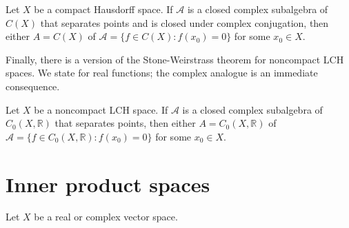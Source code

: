\documentclass{article}
\theoremstyle{definition}
\numberwithin{equation}{section}
\newcommand{\R}{\mathbb{R}}
\begin{document}
		\begin{thm}
			Let $X$ be a compact Hausdorff space. If $\mathcal{A}$ is a closed complex subalgebra of $C(X)$ that separates points and is closed under complex conjugation, then either $A=C(X)$ of $\mathcal{A}=\{f\in C(X):f(x_0)=0\}$ for some $x_0\in X$.
		\end{thm}
		Finally, there is a version of the Stone-Weirstrass theorem for noncompact LCH spaces. We state for real functions; the complex analogue is an immediate consequence.
		\begin{thm}
			Let $X$ be a noncompact LCH space. If $\mathcal{A}$ is a closed complex subalgebra of $C_0(X,\R)$ that separates points, then either $A=C_0(X,\R)$ of $\mathcal{A}=\{f\in C_0(X,\R):f(x_0)=0\}$ for some $x_0\in X$.
		\end{thm}

\clearpage
\section{Inner product spaces}
Let $X$ be a real or complex vector space.
\end{document}
